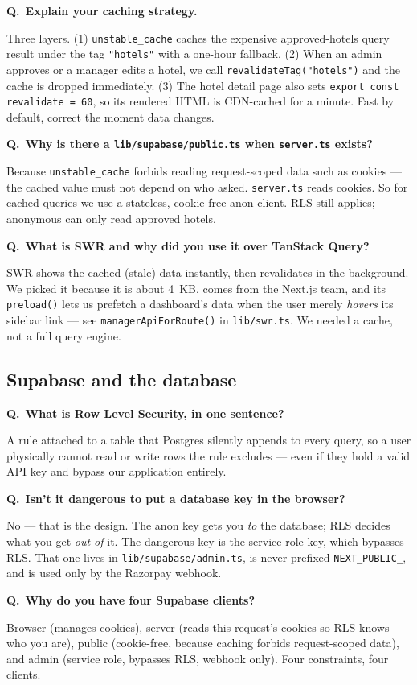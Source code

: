 \documentclass[11pt,a4paper]{article}
\newcommand{\Q}[1]{\vspace{7pt}\noindent\textbf{\color{primary}Q.}~\textbf{#1}\par\vspace{1pt}}
\newcommand{\A}[1]{\noindent #1\par}
\newcommand{\file}[1]{\texttt{\small #1}}
\begin{document}
\Q{Explain your caching strategy.}
\A{Three layers. (1) \texttt{unstable\_cache} caches the expensive approved-hotels
query result under the tag \texttt{"hotels"} with a one-hour fallback. (2) When an
admin approves or a manager edits a hotel, we call \texttt{revalidateTag("hotels")}
and the cache is dropped immediately. (3) The hotel detail page also sets
\texttt{export const revalidate = 60}, so its rendered HTML is CDN-cached for a
minute. Fast by default, correct the moment data changes.}

\Q{Why is there a \file{lib/supabase/public.ts} when \file{server.ts} exists?}
\A{Because \texttt{unstable\_cache} forbids reading request-scoped data such as
cookies --- the cached value must not depend on who asked. \file{server.ts} reads
cookies. So for cached queries we use a stateless, cookie-free anon client. RLS
still applies; anonymous can only read approved hotels.}

\Q{What is SWR and why did you use it over TanStack Query?}
\A{SWR shows the cached (stale) data instantly, then revalidates in the background.
We picked it because it is about 4~KB, comes from the Next.js team, and its
\texttt{preload()} lets us prefetch a dashboard's data when the user merely
\emph{hovers} its sidebar link --- see \texttt{managerApiForRoute()} in
\file{lib/swr.ts}. We needed a cache, not a full query engine.}

\subsection{Supabase and the database}

\Q{What is Row Level Security, in one sentence?}
\A{A rule attached to a table that Postgres silently appends to every query, so a
user physically cannot read or write rows the rule excludes --- even if they hold a
valid API key and bypass our application entirely.}

\Q{Isn't it dangerous to put a database key in the browser?}
\A{No --- that is the design. The anon key gets you \emph{to} the database; RLS
decides what you get \emph{out of} it. The dangerous key is the service-role key,
which bypasses RLS. That one lives in \file{lib/supabase/admin.ts}, is never
prefixed \texttt{NEXT\_PUBLIC\_}, and is used only by the Razorpay webhook.}

\Q{Why do you have four Supabase clients?}
\A{Browser (manages cookies), server (reads this request's cookies so RLS knows
who you are), public (cookie-free, because caching forbids request-scoped data),
and admin (service role, bypasses RLS, webhook only). Four constraints, four
clients.}
\end{document}
